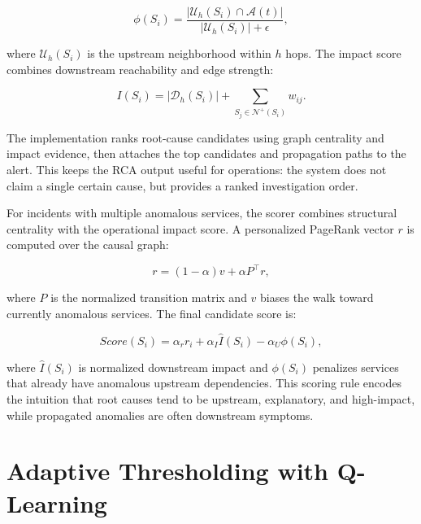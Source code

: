\begin{equation}
    \phi(S_i) =
    \frac{|\mathcal{U}_h(S_i) \cap \mathcal{A}(t)|}
    {|\mathcal{U}_h(S_i)| + \epsilon},
    \label{eq:upstream_ratio}
\end{equation}

where $\mathcal{U}_h(S_i)$ is the upstream neighborhood within $h$ hops. The
impact score combines downstream reachability and edge strength:

\begin{equation}
    I(S_i) = |\mathcal{D}_h(S_i)| +
    \sum_{S_j \in \mathcal{N}^+(S_i)} w_{ij}.
    \label{eq:impact_score}
\end{equation}

The implementation ranks root-cause candidates using graph centrality and impact
evidence, then attaches the top candidates and propagation paths to the alert.
This keeps the RCA output useful for operations: the system does not claim a
single certain cause, but provides a ranked investigation order.

For incidents with multiple anomalous services, the scorer combines structural
centrality with the operational impact score. A personalized PageRank vector
$r$ is computed over the causal graph:

\begin{equation}
    r = (1-\alpha)v + \alpha P^\top r,
    \label{eq:personalized_pagerank}
\end{equation}

where $P$ is the normalized transition matrix and $v$ biases the walk toward
currently anomalous services. The final candidate score is:

\begin{equation}
    Score(S_i) = \alpha_r r_i + \alpha_I \hat{I}(S_i)
    - \alpha_U \phi(S_i),
    \label{eq:rca_final_score}
\end{equation}

where $\hat{I}(S_i)$ is normalized downstream impact and $\phi(S_i)$ penalizes
services that already have anomalous upstream dependencies. This scoring rule
encodes the intuition that root causes tend to be upstream, explanatory, and
high-impact, while propagated anomalies are often downstream symptoms.

\section{Adaptive Thresholding with Q-Learning}
\label{sec:threshold_implementation}

